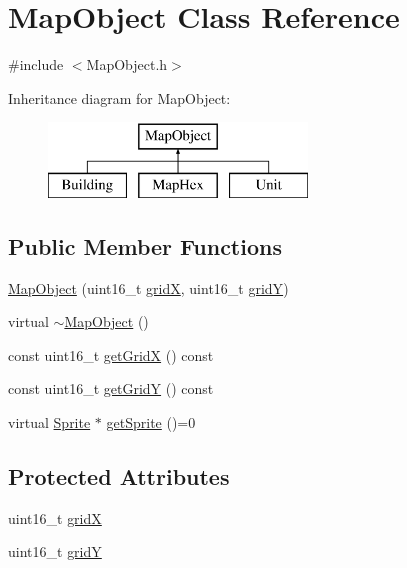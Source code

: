 \hypertarget{class_map_object}{}\section{Map\+Object Class Reference}
\label{class_map_object}


{\ttfamily \#include $<$Map\+Object.\+h$>$}

Inheritance diagram for Map\+Object\+:\begin{figure}[H]
\begin{center}
\leavevmode
\includegraphics[height=2.000000cm]{db/d5e/class_map_object}
\end{center}
\end{figure}
\subsection*{Public Member Functions}
\begin{DoxyCompactItemize}
\item 
\hyperlink{class_map_object_ae06479f6095fd54700ca5d60f69de5b6}{Map\+Object} (uint16\+\_\+t \hyperlink{class_map_object_a48d8e19188fd7ae1b74d2de47d546209}{gridX}, uint16\+\_\+t \hyperlink{class_map_object_a0d3a76d4816097941bbfb5208b81cab6}{gridY})
\item 
virtual \hyperlink{class_map_object_aa601344267a49df197e841fcbd732209}{$\sim$\+Map\+Object} ()
\item 
const uint16\+\_\+t \hyperlink{class_map_object_af738e8dcd18425f599c94c9951ed94bb}{get\+GridX} () const
\item 
const uint16\+\_\+t \hyperlink{class_map_object_a78d1316495dee5b12daca1fb2cc15f5c}{get\+GridY} () const
\item 
virtual \hyperlink{class_sprite}{Sprite} $\ast$ \hyperlink{class_map_object_a3881fea264291ba07e0172d1cd3246cc}{get\+Sprite} ()=0
\end{DoxyCompactItemize}
\subsection*{Protected Attributes}
\begin{DoxyCompactItemize}
\item 
uint16\+\_\+t \hyperlink{class_map_object_a48d8e19188fd7ae1b74d2de47d546209}{gridX}
\item 
uint16\+\_\+t \hyperlink{class_map_object_a0d3a76d4816097941bbfb5208b81cab6}{gridY}
\end{DoxyCompactItemize}


